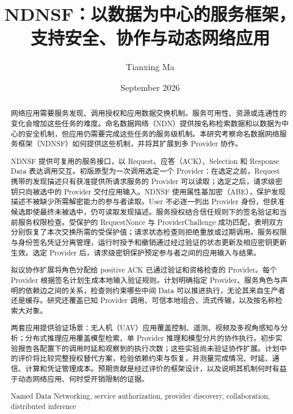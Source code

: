 \documentclass[
    doctoral,
    proposal,
    showabstract,
    secnum,
    nohyphenation,
    pdfonly,
    noboundcover
]{uofm}
\title{NDNSF：以数据为中心的服务框架，支持安全、协作与动态网络应用}
\author{Tianxing Ma}
\date{September 2026}
\begin{document}
\hypersetup{pageanchor=false}
\maketitle

\frontmatter
\hypersetup{pageanchor=true}

\begin{abstract}
网络应用需要服务发现、调用授权和应用数据交换机制。服务可用性、资源或连通性的变化会增加这些任务的难度。命名数据网络（NDN）提供按名称检索数据和以数据为中心的安全机制，但应用仍需要完成这些任务的服务级机制。本研究考察命名数据网络服务框架（NDNSF）如何提供这些机制，并将其扩展到多 Provider 协作。

NDNSF 提供可复用的服务接口，以 Request、应答（ACK）、Selection 和 Response Data 表达调用交互。初版原型为一次调用选定一个 Provider：在选定之前，Request 携带的发现描述只有获准提供所请求服务的 Provider 可以读取；选定之后，请求级密钥只向被选中的 Provider 交付应用输入。NDNSF 使用属性基加密（ABE），保护发现描述不被缺少所需解密能力的参与者读取。User 不必逐一列出 Provider 身份，但获准候选即使最终未被选中，仍可读取发现描述。服务授权结合信任规则下的签名验证和当前服务权限检查。受保护的 RequestNonce 与 ProviderChallenge 成功匹配，表明双方分别恢复了本次交换所需的受保护值；请求状态检查则拒绝重放或过期调用。服务权限与身份签名凭证分离管理，运行时授予和撤销通过经过验证的状态更新及相应密钥更新生效。选定 Provider 后，请求级密钥保护预定参与者之间的应用输入与结果。

拟议协作扩展将角色分配给 positive ACK 已通过验证和资格检查的 Provider。每个 Provider 根据签名计划生成本地输入验证规则。计划明确指定 Provider、服务角色与声明的依赖边之间的关系，检查则约束哪些中间 Data 可以推进执行，无论其来自生产者还是缓存。研究还覆盖已知 Provider 调用、可信本地组合、流式传输，以及按名称检索大对象。

两套应用提供验证场景：无人机（UAV）应用覆盖控制、遥测、视频及多视角感知与分析；分布式推理应用覆盖模型检索、单 Provider 推理和模型分片的协作执行。初步实验报告各配置下的调用时延和观察到的执行次数；这些实验尚未验证协作扩展。计划中的评价将比较完整授权替代方案，检验依赖约束与恢复，并测量完成情况、时延、通信、计算和凭证管理成本。预期贡献是经过评价的框架设计，以及说明其机制何时有益于动态网络应用、何时受开销限制的证据。
\begin{keywords}
Named Data Networking, service authorization, provider discovery, collaboration, distributed inference
\end{keywords}
\end{abstract}
\tableofcontents
\mainmatter
\newcommand{\proposalroot}{..}

\appendix



\end{document}
